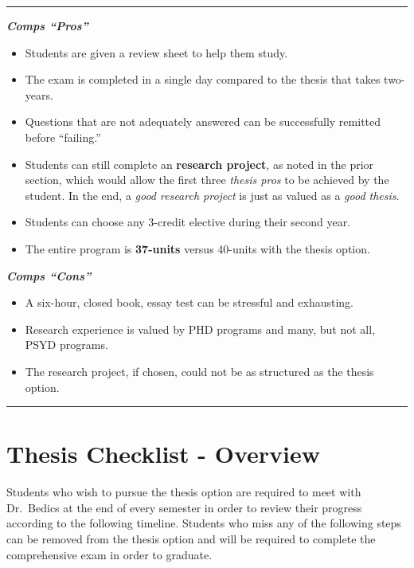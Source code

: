 \documentclass[openany]{book}
\providecommand{\tightlist}{%
  \setlength{\itemsep}{0pt}\setlength{\parskip}{0pt}}
\begin{document}
\begin{center}\rule{0.5\linewidth}{0.5pt}\end{center}

\textbf{\emph{Comps ``Pros''}}

\begin{itemize}
\tightlist
\item
  Students are given a review sheet to help them study.
\item
  The exam is completed in a single day compared to the thesis that takes two-years.
\item
  Questions that are not adequately answered can be successfully remitted before ``failing.''
\item
  Students can still complete an \textbf{research project}, as noted in the prior section, which would allow the first three \emph{thesis pros} to be achieved by the student. In the end, a \emph{good research project} is just as valued as a \emph{good thesis}.
\item
  Students can choose any 3-credit elective during their second year.
\item
  The entire program is \textbf{37-units} versus 40-units with the thesis option.
\end{itemize}

\textbf{\emph{Comps ``Cons''}}

\begin{itemize}
\tightlist
\item
  A six-hour, closed book, essay test can be stressful and exhausting.
\item
  Research experience is valued by PHD programs and many, but not all, PSYD programs.
\item
  The research project, if chosen, could not be as structured as the thesis option.
\end{itemize}

\begin{center}\rule{0.5\linewidth}{0.5pt}\end{center}

\hypertarget{thesis-checklist---overview}{%
\chapter{Thesis Checklist - Overview}\label{thesis-checklist---overview}}

Students who wish to pursue the thesis option are required to meet with Dr.~Bedics at the end of every semester in order to review their progress according to the following timeline. Students who miss any of the following steps can be removed from the thesis option and will be required to complete the comprehensive exam in order to graduate.
\end{document}
